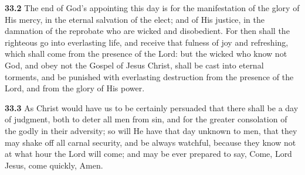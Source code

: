 \par\textbf{33.2} The end of God's appointing this day is for the manifestation of the glory of His mercy, in the eternal salvation of the elect; and of His justice, in the damnation of the reprobate who are wicked and disobedient. For then shall the righteous go into everlasting life, and receive that fulness of joy and refreshing, which shall come from the presence of the Lord: but the wicked who know not God, and obey not the Gospel of Jesus Christ, shall be cast into eternal torments, and be punished with everlasting destruction from the presence of the Lord, and from the glory of His power.   

\par\textbf{33.3} As Christ would have us to be certainly persuaded that there shall be a day of judgment, both to deter all men from sin, and for the greater consolation of the godly in their adversity; so will He have that day unknown to men, that they may shake off all carnal security, and be always watchful, because they know not at what hour the Lord will come; and may be ever prepared to say, Come, Lord Jesus, come quickly, Amen. 
